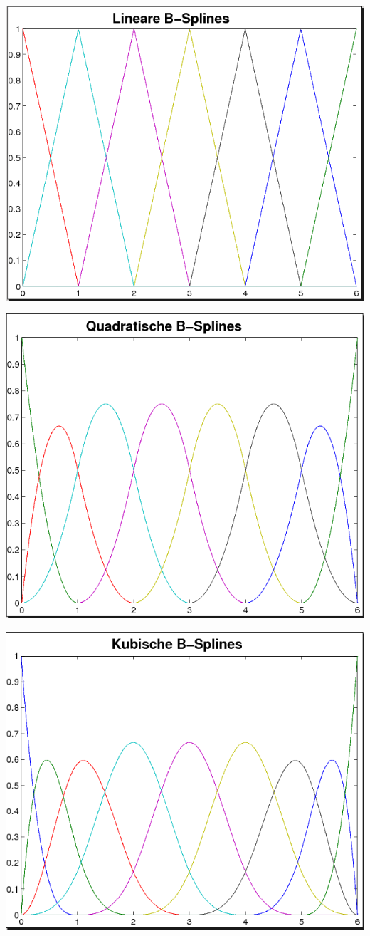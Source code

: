 {\centering
  \includegraphics[width=\linewidth]{images/linBsplines.png}

  \includegraphics[width=\linewidth]{images/quadBsplines.png}

\includegraphics[width=\linewidth]{images/kubBsplines.png}
}

